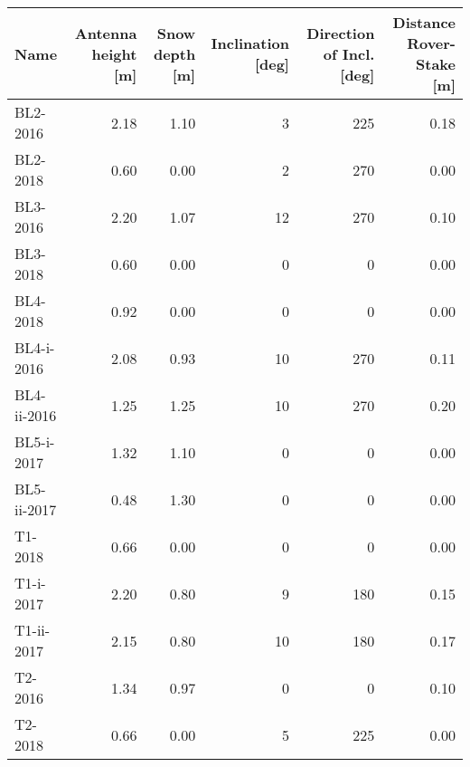 \begin{tabular}{lrrrrr}
\toprule
        Name &  Antenna height [m] &  Snow depth [m] &  Inclination [deg] &  Direction of Incl. [deg] &  Distance Rover-Stake [m] \\
\midrule
    BL2-2016 &                2.18 &            1.10 &                  3 &                       225 &                      0.18 \\
    BL2-2018 &                0.60 &            0.00 &                  2 &                       270 &                      0.00 \\
    BL3-2016 &                2.20 &            1.07 &                 12 &                       270 &                      0.10 \\
    BL3-2018 &                0.60 &            0.00 &                  0 &                         0 &                      0.00 \\
    BL4-2018 &                0.92 &            0.00 &                  0 &                         0 &                      0.00 \\
  BL4-i-2016 &                2.08 &            0.93 &                 10 &                       270 &                      0.11 \\
 BL4-ii-2016 &                1.25 &            1.25 &                 10 &                       270 &                      0.20 \\
  BL5-i-2017 &                1.32 &            1.10 &                  0 &                         0 &                      0.00 \\
 BL5-ii-2017 &                0.48 &            1.30 &                  0 &                         0 &                      0.00 \\
     T1-2018 &                0.66 &            0.00 &                  0 &                         0 &                      0.00 \\
   T1-i-2017 &                2.20 &            0.80 &                  9 &                       180 &                      0.15 \\
  T1-ii-2017 &                2.15 &            0.80 &                 10 &                       180 &                      0.17 \\
     T2-2016 &                1.34 &            0.97 &                  0 &                         0 &                      0.10 \\
     T2-2018 &                0.66 &            0.00 &                  5 &                       225 &                      0.00 \\

\end{tabular}
